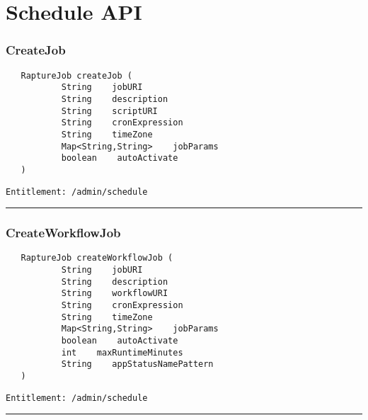 \chapter{Schedule API}

\subsection{CreateJob}
\label{Api:CreateJob}
\begin{Verbatim}
   RaptureJob createJob (
           String    jobURI
           String    description
           String    scriptURI
           String    cronExpression
           String    timeZone
           Map<String,String>    jobParams
           boolean    autoActivate
   )
\end{Verbatim}
\begin{Verbatim}[formatcom=\color{Maroon}]
  Entitlement: /admin/schedule
\end{Verbatim}



\rule{12cm}{2pt}
\subsection{CreateWorkflowJob}
\label{Api:CreateWorkflowJob}
\begin{Verbatim}
   RaptureJob createWorkflowJob (
           String    jobURI
           String    description
           String    workflowURI
           String    cronExpression
           String    timeZone
           Map<String,String>    jobParams
           boolean    autoActivate
           int    maxRuntimeMinutes
           String    appStatusNamePattern
   )
\end{Verbatim}
\begin{Verbatim}[formatcom=\color{Maroon}]
  Entitlement: /admin/schedule
\end{Verbatim}



\rule{12cm}{2pt}
